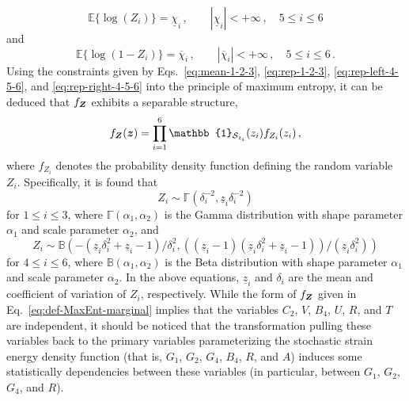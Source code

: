 \begin{equation}\label{eq:rep-left-4-5-6}
    \mathbb{E}\{\log{(Z_i)}\} = \underline{\chi}_i\,, \quad \quad |\underline{\chi}_i| < + \infty \,, \quad 5 \leq i \leq 6
\end{equation}
and 
\begin{equation}\label{eq:rep-right-4-5-6}
    \mathbb{E}\{\log{(1-Z_i)}\} = \overline{\chi}_i\,, \quad \quad |\overline{\chi}_i| < + \infty \,, \quad 5 \leq i \leq 6\,.
\end{equation}
Using the constraints given by Eqs.~\eqref{eq:mean-1-2-3}, \eqref{eq:rep-1-2-3}, \eqref{eq:rep-left-4-5-6}, and \eqref{eq:rep-right-4-5-6} into the principle of maximum entropy, it can be deduced that $f_{\boldsymbol{Z}}$ exhibits a separable structure, 
\begin{equation}\label{eq:def-MaxEnt-marginal}
    f_{\bfZ}(\bfz) = \prod_{i = 1}^{6} \mathbb{1}_{\mathcal{S}_{z_i}}(z_i) f_{Z_i}(z_i)\,,
\end{equation}
where $f_{Z_i}$ denotes the probability density function defining the random variable $Z_i$. Specifically, it is found that
\begin{equation}\label{eq:def-MaxEnt-1-3}
    Z_i \sim \mathbb{\Gamma}(\delta_i^{-2}, \underline{z}_i \delta_i^{-2})
\end{equation}
for $1 \leq i \leq 3$, where $\mathbb{\Gamma}(\alpha_1, \alpha_2)$ is the Gamma distribution with shape parameter $\alpha_1$ and scale parameter $\alpha_2$, and
\begin{equation}\label{eq:def-MaxEnt-4-6}
    Z_i \sim \mathbb{B}(-(\underline{z}_i\delta_i^2 + \underline{z}_i - 1)/\delta_i^2, ((\underline{z}_i - 1)(\underline{z}_i\delta_i^2 + \underline{z}_i - 1))/(\underline{z}_i \delta_i^2))
\end{equation}
for $4 \leq i \leq 6$, where $\mathbb{B}(\alpha_1, \alpha_2)$ is the Beta distribution with shape parameter $\alpha_1$ and scale parameter $\alpha_2$. In the above equations, $\underline{z}_i$ and $\delta_i$ are the mean and coefficient of variation of $Z_i$, respectively. While the form of $f_{\boldsymbol{Z}}$ given in Eq.~\eqref{eq:def-MaxEnt-marginal} implies that the variables $C_2$, $V$, $B_4$, $U$, $R$, and $T$ are independent, it should be noticed that the transformation pulling these variables back to the primary variables parameterizing the stochastic strain energy density function (that is, $G_1$, $G_2$, $G_4$, $B_4$, $R$, and $A$) induces some statistically dependencies between these variables (in particular, between $G_1$, $G_2$, $G_4$, and $R$).

